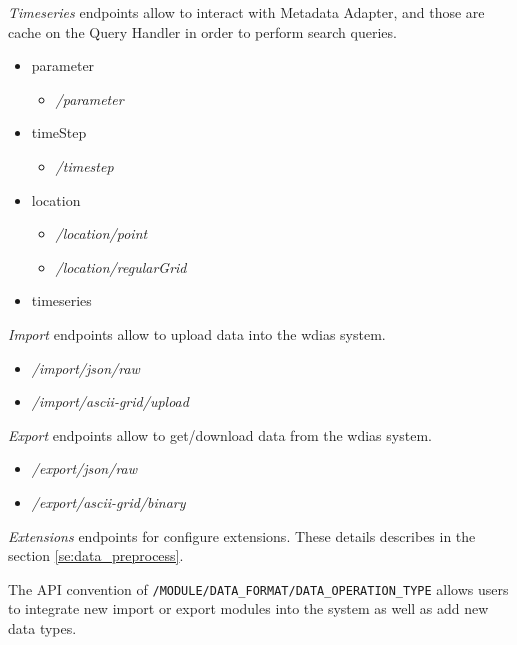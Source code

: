 \emph{Timeseries} endpoints allow to interact with Metadata Adapter, and those are cache on the Query Handler in order to perform search queries.
\begin{itemize}
    \item parameter
    \begin{itemize}
        \item \emph{/parameter}
    \end{itemize}
    \item timeStep
    \begin{itemize}
        \item \emph{/timestep}
    \end{itemize}
    \item location
    \begin{itemize}
        \item \emph{/location/point}
        \item \emph{/location/regularGrid}
    \end{itemize}
    \item timeseries
\end{itemize}

\emph{Import} endpoints allow to upload data into the \acrshort{wdias} system.
\begin{itemize}
    \item \emph{/import/json/raw}
    \item \emph{/import/ascii-grid/upload}
\end{itemize}

\emph{Export} endpoints allow to get/download data from the \acrshort{wdias} system.
\begin{itemize}
    \item \emph{/export/json/raw}
    \item \emph{/export/ascii-grid/binary}
\end{itemize}

\emph{Extensions} endpoints for configure extensions. These details describes in the section \ref{se:data_preprocess}.

The API convention of \texttt{/MODULE/DATA\_FORMAT/DATA\_OPERATION\_TYPE} allows users to integrate new import or export modules into the system as well as add new data types.
